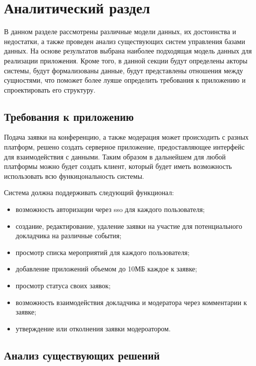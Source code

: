 \section{Аналитический раздел} \label{analysis}


В данном разделе рассмотрены различные модели данных, их достоинства и недостатки, а также проведен анализ существующих систем управления базами данных. На основе результатов выбрана наиболее подходящая модель данных для реализации приложения. Кроме того, в данной секции будут определены акторы системы, будут формализованы данные, будут представлены отношения между сущностями, что поможет более луяше определить требования к приложению и спроектировать его структуру.

\subsection{Требования к приложению}

Подача заявки на конференцию, а также модерация может происходить с разных платформ, решено создать серверное приложение, предоставляющее интерфейс для взаимодействия с данными.  Таким образом в дальнейшем для любой платформы можно будет создать клиент, который будет иметь возможность использовать всю функицональность системы.

Система должна поддерживать следующий функционал:
\begin{itemize}[label=---]
		\item возможность авторизации через sso\cite{sso} для каждого пользователя;
		\item создание, редактирование, удаление заявки на участие для потенциального докладчика на различные события;
		\item просмотр списка мероприятий для каждого пользователя;
		\item добавление приложений объемом до 10МБ каждое к заявке;
		\item просмотр статуса своих заявок;
		\item возможность взаимодействия докладчика и модератора через комментарии к заявке;
		\item утверждение или отколнения заявки модероатором.
\end{itemize}

\subsection{Анализ существующих решений}

